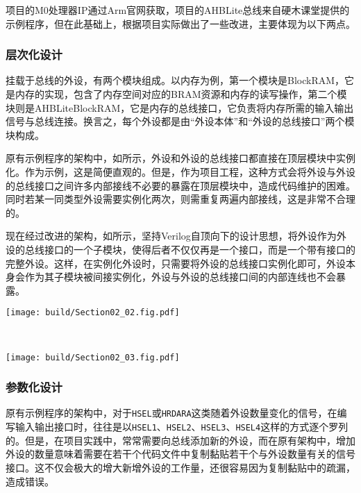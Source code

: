 项目的M0处理器IP通过Arm官网获取，项目的AHBLite总线来自硬木课堂提供的示例程序，但在此基础上，根据项目实际做出了一些改进，主要体现为以下两点。

\subsubsection{层次化设计}
挂载于总线的外设，有两个模块组成。以内存为例，第一个模块是BlockRAM，它是内存的实现，包含了内存空间对应的BRAM资源和内存的读写操作，第二个模块则是AHBLiteBlockRAM，它是内存的总线接口，它负责将内存所需的输入输出信号与总线连接。换言之，每个外设都是由“外设本体”和“外设的总线接口”两个模块构成。

原有示例程序的架构中，如所示，外设和外设的总线接口都直接在顶层模块中实例化。作为示例，这是简便直观的。但是，作为项目工程，这种方式会将外设与外设的总线接口之间许多内部接线不必要的暴露在顶层模块中，造成代码维护的困难。同时若某一同类型外设需要实例化两次，则需重复两遍内部接线，这是非常不合理的。

现在经过改进的架构，如所示，坚持Verilog自顶向下的设计思想，将外设作为外设的总线接口的一个子模块，使得后者不仅仅再是一个接口，而是一个带有接口的完整外设。这样，在实例化外设时，只需要将外设的总线接口实例化即可，外设本身会作为其子模块被间接实例化，外设与外设的总线接口间的内部连线也不会暴露。


\begin{Figure}[层次化设计优化]
    \begin{FigureSub}[原有架构]
        \texttt{[image: build/Section02\_02.fig.pdf]}
    \end{FigureSub}\\ \vspace{0.5cm}
    \begin{FigureSub}[现有架构]
        \texttt{[image: build/Section02\_03.fig.pdf]}
    \end{FigureSub}
\end{Figure}

\subsubsection{参数化设计}
原有示例程序的架构中，对于\texttt{HSEL}或\texttt{HRDARA}这类随着外设数量变化的信号，在编写输入输出接口时，往往是以\texttt{HSEL1}、\texttt{HSEL2}、\texttt{HSEL3}、\texttt{HSEL4}这样的方式逐个罗列的。但是，在项目实践中，常常需要向总线添加新的外设，而在原有架构中，增加外设的数量意味着需要在若干个代码文件中复制黏贴若干个与外设数量有关的信号接口。这不仅会极大的增大新增外设的工作量，还很容易因为复制黏贴中的疏漏，造成错误。

